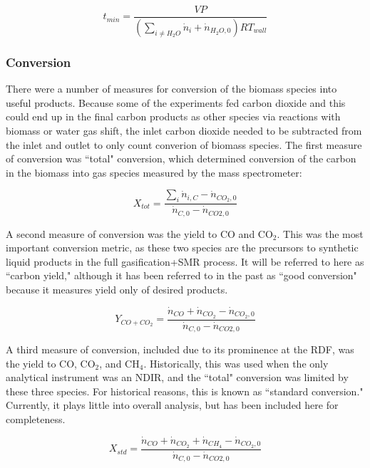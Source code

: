 \documentclass[11pt,twocolumn]{article}
\begin{document}
\begin{equation}
	t_{min} = \frac{VP}{(\sum_{i \ne H_{2}O}\dot{n}_{i}+\dot{n}_{H_{2}O,0})RT_{wall}}
\end{equation}

\subsubsection*{Conversion}
There were a number of measures for conversion of the biomass species into useful products.  Because some of the experiments fed carbon dioxide and this could end up in the final carbon products as other species via reactions with biomass or water gas shift, the inlet carbon dioxide needed to be subtracted from the inlet and outlet to only count converion of biomass species.  The first measure of conversion was ``total" conversion, which determined conversion of the carbon in the biomass into gas species measured by the mass spectrometer:

\begin{equation}
	X_{tot} = \frac{\sum_{i}\dot{n}_{i,C}-\dot{n}_{CO_{2},0}}{\dot{n}_{C,0}-\dot{n}_{CO{2},0}}
\end{equation}

A second measure of conversion was the yield to CO and CO$_2$.  This was the most important conversion metric, as these two species are the precursors to synthetic liquid products in the full gasification+SMR process.  It will be referred to here as ``carbon yield," although it has been referred to in the past as ``good conversion" because it measures yield only of desired products.

\begin{equation}
	Y_{CO+CO_{2}} = \frac{\dot{n}_{CO}+\dot{n}_{CO_{2}}-\dot{n}_{CO_{2},0}}{\dot{n}_{C,0}-\dot{n}_{CO{2},0}}
\end{equation}

A third measure of conversion, included due to its prominence at the RDF, was the yield to CO, CO$_2$, and CH$_4$.  Historically, this was used when the only analytical instrument was an NDIR, and the ``total" conversion was limited by these three species.  For historical reasons, this is known as ``standard conversion."  Currently, it plays little into overall analysis, but has been included here for completeness.

\begin{equation}
	X_{std} =  \frac{\dot{n}_{CO}+\dot{n}_{CO_{2}}+\dot{n}_{CH_{4}}-\dot{n}_{CO_{2},0}}{\dot{n}_{C,0}-\dot{n}_{CO{2},0}}
\end{equation}
\end{document}
